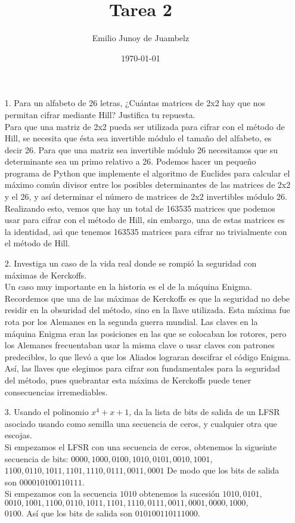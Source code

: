 \documentclass[12pt]{article}
\title{Tarea 2}
\author{Emilio Junoy de Juambelz}
\date{\today}
\begin{document}
  \maketitle
  \begin{enumerate}
    \item[1.] Para un alfabeto de 26 letras, ¿Cuántas matrices de 2x2 hay que nos permitan cifrar mediante Hill?
      Justifica tu repuesta.\\
      Para que una matriz de 2x2 pueda ser utilizada para cifrar con el método de Hill, se necesita que 
      ésta sea invertible módulo el tamaño del alfabeto, es decir 26. Para que una matriz sea invertible 
      módulo 26 necesitamos que su determinante sea un primo relativo a 26. Podemos hacer un pequeño programa de Python
      que implemente el algoritmo de Euclides para calcular el máximo común divisor entre los posibles determinantes de 
      las matrices de 2x2 y el 26, y así determinar el número de matrices de 2x2 invertibles módulo 26.\\
      Realizando esto, vemos que hay un total de 163535 matrices que podemos usar para cifrar con el método de Hill,
      sin embargo, una de estas matrices es la identidad, asì que tenemos 163535 matrices para cifrar no trivialmente 
      con el método de Hill.
    
    \item[2.] Investiga un caso de la vida real donde se rompió la seguridad con máximas de Kerckoffs.\\
      Un caso muy importante en la historia es el de la máquina Enigma. Recordemos que una de las máximas de Kerckoffs 
      es que la seguridad no debe residir en la obsuridad del método, sino en la llave utilizada. Esta máxima fue rota
      por los Alemanes en la segunda guerra mundial. Las claves en la máquina Enigma eran las posiciones en las que se
      colocaban los rotores, pero los Alemanes frecuentaban usar la misma clave o usar claves con patrones predecibles, 
      lo que llevó a que los Aliados lograran descifrar el código Enigma.
      Así, las llaves que elegimos para cifrar 
      son fundamentales para la seguridad del método, pues quebrantar esta máxima de Kerckoffs puede tener 
      consecuencias irremediables.

    \item[3.] Usando el polinomio $x^4+x+1$, da la lista de bits de salida de un LFSR asociado usando como semilla 
      una secuencia de ceros, y cualquier otra que escojas.\\
      Si empezamos el LFSR con una secuencia de ceros, obtenemos la sigueinte secuencia de bits:
      $0000,1000,0100,1010,0101,0010,1001,$\\$1100,0110,1011,1101,1110,0111,0011,0001$
      De modo que los bits de salida son $000010100110111$.\\
      Si empezamos con la secuencia $1010$ obtenemos la sucesión $1010,0101,$\\$0010,1001,1100,0110,1011,1101,1110,0111,0011,0001,0000,1000,$\\$0100$.
      Así que los bits de salida son $010100110111000$.


\end{enumerate}
\end{document}
